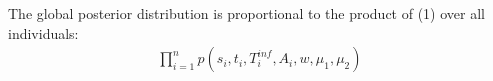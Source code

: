 \documentclass[10pt]{article}
\begin{document}
The global posterior distribution is proportional to the product of (1) over all individuals:
\begin{eqnarray}
\prod_{i=1}^n p(s_i, t_i, T_i^{inf}, A_i, w, \mu_1, \mu_2)
\end{eqnarray}


% 
% 
% 
% 
% 
% 
% 
% 
%   
% 
\end{document}
